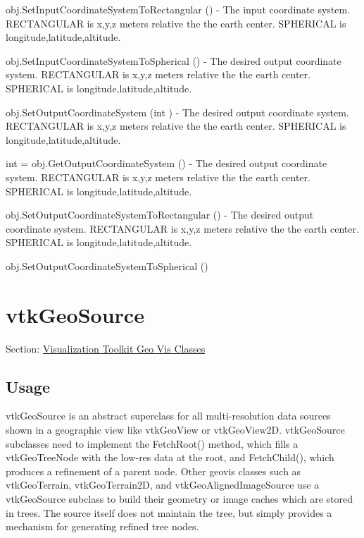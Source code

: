 \begin{DoxyItemize}
\item {\ttfamily obj.\-Set\-Input\-Coordinate\-System\-To\-Rectangular ()} -\/ The input coordinate system. R\-E\-C\-T\-A\-N\-G\-U\-L\-A\-R is x,y,z meters relative the the earth center. S\-P\-H\-E\-R\-I\-C\-A\-L is longitude,latitude,altitude.  
\item {\ttfamily obj.\-Set\-Input\-Coordinate\-System\-To\-Spherical ()} -\/ The desired output coordinate system. R\-E\-C\-T\-A\-N\-G\-U\-L\-A\-R is x,y,z meters relative the the earth center. S\-P\-H\-E\-R\-I\-C\-A\-L is longitude,latitude,altitude.  
\item {\ttfamily obj.\-Set\-Output\-Coordinate\-System (int )} -\/ The desired output coordinate system. R\-E\-C\-T\-A\-N\-G\-U\-L\-A\-R is x,y,z meters relative the the earth center. S\-P\-H\-E\-R\-I\-C\-A\-L is longitude,latitude,altitude.  
\item {\ttfamily int = obj.\-Get\-Output\-Coordinate\-System ()} -\/ The desired output coordinate system. R\-E\-C\-T\-A\-N\-G\-U\-L\-A\-R is x,y,z meters relative the the earth center. S\-P\-H\-E\-R\-I\-C\-A\-L is longitude,latitude,altitude.  
\item {\ttfamily obj.\-Set\-Output\-Coordinate\-System\-To\-Rectangular ()} -\/ The desired output coordinate system. R\-E\-C\-T\-A\-N\-G\-U\-L\-A\-R is x,y,z meters relative the the earth center. S\-P\-H\-E\-R\-I\-C\-A\-L is longitude,latitude,altitude.  
\item {\ttfamily obj.\-Set\-Output\-Coordinate\-System\-To\-Spherical ()}  
\end{DoxyItemize}\hypertarget{vtkgeovis_vtkgeosource}{}\section{vtk\-Geo\-Source}\label{vtkgeovis_vtkgeosource}
Section\-: \hyperlink{sec_vtkgeovis}{Visualization Toolkit Geo Vis Classes} \hypertarget{vtkwidgets_vtkxyplotwidget_Usage}{}\subsection{Usage}\label{vtkwidgets_vtkxyplotwidget_Usage}
vtk\-Geo\-Source is an abstract superclass for all multi-\/resolution data sources shown in a geographic view like vtk\-Geo\-View or vtk\-Geo\-View2\-D. vtk\-Geo\-Source subclasses need to implement the Fetch\-Root() method, which fills a vtk\-Geo\-Tree\-Node with the low-\/res data at the root, and Fetch\-Child(), which produces a refinement of a parent node. Other geovis classes such as vtk\-Geo\-Terrain, vtk\-Geo\-Terrain2\-D, and vtk\-Geo\-Aligned\-Image\-Source use a vtk\-Geo\-Source subclass to build their geometry or image caches which are stored in trees. The source itself does not maintain the tree, but simply provides a mechanism for generating refined tree nodes.

